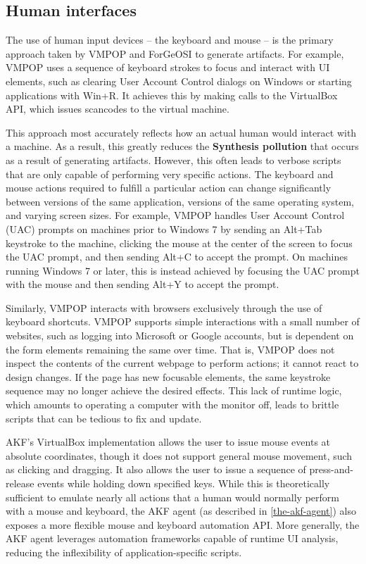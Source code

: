 \subsection{Human interfaces}\label{human-interfaces}

The use of human input devices -- the keyboard and mouse -- is the
primary approach taken by VMPOP \cite{parkTREDEVMPOPCultivating2018}
and ForGeOSI \cite{maxfraggMaxfraggForGeOSI2023} to generate
artifacts. For example, VMPOP uses a sequence of keyboard strokes to
focus and interact with UI elements, such as clearing User Account
Control dialogs on Windows or starting applications with Win+R. It
achieves this by making calls to the VirtualBox API, which issues
scancodes to the virtual machine.

This approach most accurately reflects how an actual human would
interact with a machine. As a result, this greatly reduces the
\textbf{Synthesis pollution} that occurs as a result of generating
artifacts. However, this often leads to verbose scripts that are only
capable of performing very specific actions. The keyboard and mouse
actions required to fulfill a particular action can change significantly
between versions of the same application, versions of the same operating
system, and varying screen sizes. For example, VMPOP handles User
Account Control (UAC) prompts on machines prior to Windows 7 by sending
an Alt+Tab keystroke to the machine, clicking the mouse at the center of
the screen to focus the UAC prompt, and then sending Alt+C to accept the
prompt. On machines running Windows 7 or later, this is instead achieved
by focusing the UAC prompt with the mouse and then sending Alt+Y to
accept the prompt.

Similarly, VMPOP interacts with browsers exclusively through the use of
keyboard shortcuts. VMPOP supports simple interactions with a small
number of websites, such as logging into Microsoft or Google accounts,
but is dependent on the form elements remaining the same over time. That
is, VMPOP does not inspect the contents of the current webpage to
perform actions; it cannot react to design changes. If the page has new
focusable elements, the same keystroke sequence may no longer achieve
the desired effects. This lack of runtime logic, which amounts to
operating a computer with the monitor off, leads to brittle scripts that
can be tedious to fix and update.

AKF's VirtualBox implementation allows the user to issue mouse events at
absolute coordinates, though it does not support general mouse movement,
such as clicking and dragging. It also allows the user to issue a
sequence of press-and-release events while holding down specified keys.
While this is theoretically sufficient to emulate nearly all actions
that a human would normally perform with a mouse and keyboard, the AKF
agent (as described in \autoref{the-akf-agent}) also exposes a more flexible mouse and keyboard automation API.
More generally, the AKF agent leverages automation frameworks capable of
runtime UI analysis, reducing the inflexibility of application-specific
scripts.

